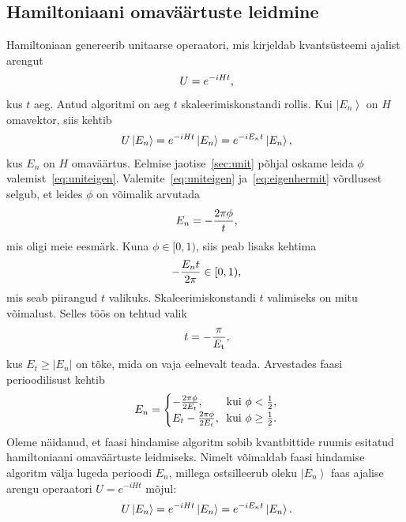 \documentclass[12pt]{report}
\def\abs#1{\left|#1\right|}
\def\ket#1{\left|#1\right>}
\begin{document}
\subsection{Hamiltoniaani omaväärtuste leidmine}\label{sec:ham}

Hamiltoniaan genereerib unitaarse operaatori, mis kirjeldab kvantsüsteemi ajalist arengut
\begin{align}
    U = e^{-iHt} \rlap{,}
\end{align}
kus \(t\) aeg.
Antud algoritmi on aeg \(t\) skaleerimiskonstandi rollis.
Kui \(\ket{E_n}\) on \(H\) omavektor, siis kehtib
\begin{align}\label{eq:eigenhermit}
    U \ket{E_n} = e^{-iHt}\ket{E_n} = e^{-i E_n t} \ket{E_n} \rlap{,}
\end{align}
kus \(E_n\) on \(H\) omaväärtus.
Eelmise jaotise~\ref{sec:unit} põhjal oskame leida \(\phi\) valemist~\eqref{eq:uniteigen}.
Valemite~\eqref{eq:uniteigen} ja~\eqref{eq:eigenhermit} võrdlusest selgub, et leides \(\phi\) on võimalik arvutada
\begin{align}
    E_n = -\frac{2\pi\phi}{t} \rlap{,}
\end{align}
mis oligi meie eesmärk.
Kuna \(\phi \in [0, 1)\), siis peab lisaks kehtima
\begin{align}
    -\frac{E_n t}{2\pi} \in [0, 1) \rlap{,}
\end{align}
mis seab piirangud \(t\) valikuks.
Skaleerimiskonstandi \(t\) valimiseks on mitu võimalust.
Selles töös on tehtud valik
\begin{align}
    t = -\frac{\pi}{E_\mathrm{t}} \rlap{,}
\end{align}
kus \(E_t \ge \abs{E_n}\) on tõke, mida on vaja eelnevalt teada.
Arvestades faasi perioodilisust kehtib
\begin{align}
    E_n = \begin{cases}
        -\frac{2\pi\phi}{2E_t}\rlap{,} & \text{kui } \phi < \frac{1}{2} \rlap{,} \\
        E_t - \frac{2\pi\phi}{2E_t}\rlap{,} & \text{kui } \phi \ge \frac{1}{2} \rlap{.} \\
    \end{cases}
\end{align}
Oleme näidanud, et faasi hindamise algoritm sobib kvantbittide ruumis esitatud hamiltoniaani omaväärtuste leidmiseks.
Nimelt võimaldab faasi hindamise algoritm välja lugeda perioodi \(E_n\), millega ostsilleerub oleku \(\ket{E_n}\) faas ajalise arengu operaatori \(U = e^{-iHt}\) mõjul:
\begin{align}
    U \ket{E_n} = e^{-iHt} \ket{E_n} = e^{-iE_n t} \ket{E_n} \rlap{.}
\end{align}
\end{document}
